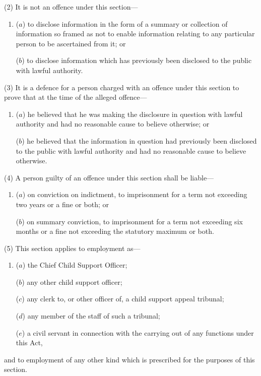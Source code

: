 \documentclass[12pt,a4paper]{article}
\begin{document}
(2) It is not an offence under this section—
\begin{enumerate}\item[]
($a$) to disclose information in the form of a summary or collection of information so framed as not to enable information relating to any particular person to be ascertained from it; or

($b$) to disclose information which has previously been disclosed to the public with lawful authority.
\end{enumerate}

(3) It is a defence for a person charged with an offence under this section to prove that at the time of the alleged offence—
\begin{enumerate}\item[]
($a$) he believed that he was making the disclosure in question with lawful authority and had no reasonable cause to believe otherwise; or

($b$) he believed that the information in question had previously been disclosed to the public with lawful authority and had no reasonable cause to believe otherwise.
\end{enumerate}

(4) A person guilty of an offence under this section shall be liable—
\begin{enumerate}\item[]
($a$) on conviction on indictment, to imprisonment for a term not exceeding two years or a fine or both; or

($b$) on summary conviction, to imprisonment for a term not exceeding six months or a fine not exceeding the statutory maximum or both.
\end{enumerate}

(5) This section applies to employment as—
\begin{enumerate}\item[]
($a$) the Chief Child Support Officer;

($b$) any other child support officer;

($c$) any clerk to, or other officer of, a child support appeal tribunal;

($d$) any member of the staff of such a tribunal;

($e$) a civil servant in connection with the carrying out of any functions under this Act,
\end{enumerate}
and to employment of any other kind which is prescribed for the purposes of this section.
\end{document}
